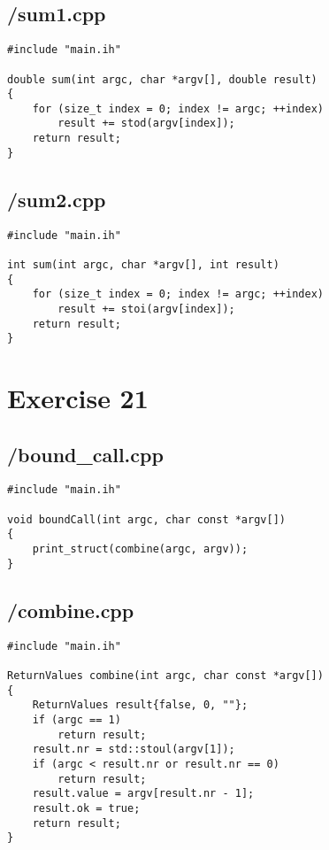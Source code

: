 \documentclass{article}
\begin{document}
\subsection*{/sum1.cpp}
\begin{verbatim}
#include "main.ih"

double sum(int argc, char *argv[], double result)
{
    for (size_t index = 0; index != argc; ++index)
        result += stod(argv[index]);
    return result;
}

\end{verbatim}
\subsection*{/sum2.cpp}
\begin{verbatim}
#include "main.ih"

int sum(int argc, char *argv[], int result)
{
    for (size_t index = 0; index != argc; ++index)
        result += stoi(argv[index]);
    return result;
}

\end{verbatim}

\section*{Exercise 21}
\subsection*{/bound\_call.cpp}
\begin{verbatim}
#include "main.ih"

void boundCall(int argc, char const *argv[])
{
    print_struct(combine(argc, argv));
}

\end{verbatim}
\subsection*{/combine.cpp}
\begin{verbatim}
#include "main.ih"

ReturnValues combine(int argc, char const *argv[])
{
    ReturnValues result{false, 0, ""};
    if (argc == 1)
        return result;
    result.nr = std::stoul(argv[1]);
    if (argc < result.nr or result.nr == 0)
        return result;
    result.value = argv[result.nr - 1];
    result.ok = true;
    return result;
}
\end{verbatim}
\end{document}
